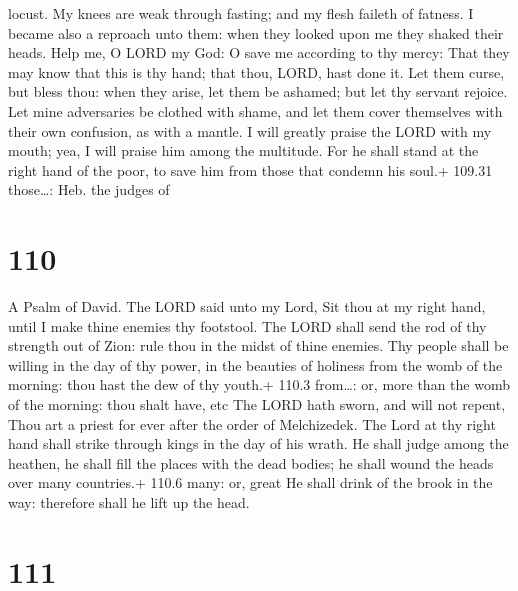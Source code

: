 locust.  My knees are weak through fasting; and my flesh
faileth of fatness.  I became also a reproach unto them:
when they looked upon me they shaked their heads.  Help me,
O LORD my God: O save me according to thy mercy:  That they
may know that this is thy hand; that thou, LORD, hast done it.
 Let them curse, but bless thou: when they arise, let them
be ashamed; but let thy servant rejoice.  Let mine
adversaries be clothed with shame, and let them cover themselves with
their own confusion, as with a mantle.  I will greatly
praise the LORD with my mouth; yea, I will praise him among the
multitude.  For he shall stand at the right hand of the
poor, to save him from those that condemn his soul.+ 109.31 those\ldots:
Heb. the judges of

\hypertarget{section-109}{%
\section{110}\label{section-109}}

A Psalm of David.  The LORD said unto my Lord, Sit thou at
my right hand, until I make thine enemies thy footstool. 
The LORD shall send the rod of thy strength out of Zion: rule thou in
the midst of thine enemies.  Thy people shall be willing in
the day of thy power, in the beauties of holiness from the womb of the
morning: thou hast the dew of thy youth.+ 110.3 from\ldots: or, more
than the womb of the morning: thou shalt have, etc  The LORD
hath sworn, and will not repent, Thou art a priest for ever after the
order of Melchizedek.  The Lord at thy right hand shall
strike through kings in the day of his wrath.  He shall
judge among the heathen, he shall fill the places with the dead bodies;
he shall wound the heads over many countries.+ 110.6 many: or, great
 He shall drink of the brook in the way: therefore shall he
lift up the head.

\hypertarget{section-110}{%
\section{111}\label{section-110}}

